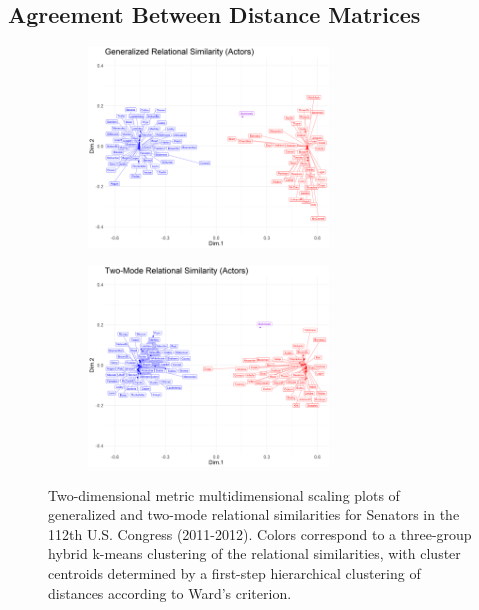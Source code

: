 \documentclass[a4paper,fleqn]{cas-sc}
\begin{document}
\subsection{Agreement Between Distance Matrices}
\begin{figure}[ht!]
     \begin{subfigure}[b]{1.0\textwidth}
        \centering
        \includegraphics[width=0.7\textwidth]{Plots/grs-actors-sb.png}
        \caption{}
        \label{fig:grs-actors-sb}
    \end{subfigure} 
     \begin{subfigure}[b]{1.0\textwidth}
        \centering
        \includegraphics[width=0.7\textwidth]{Plots/tmrs-actors-sb.png}
        \caption{}
        \label{fig:tmrs-actors-sb}
    \end{subfigure} 
    \caption{Two-dimensional metric multidimensional scaling plots of generalized and two-mode relational similarities for Senators in the 112th U.S. Congress (2011-2012). Colors correspond to a three-group hybrid k-means clustering of the relational similarities, with cluster centroids determined by a first-step hierarchical clustering of distances according to Ward's \citeyearpar{ward63} criterion.}
    \label{fig:actors-sb}
 \end{figure}
\end{document}
